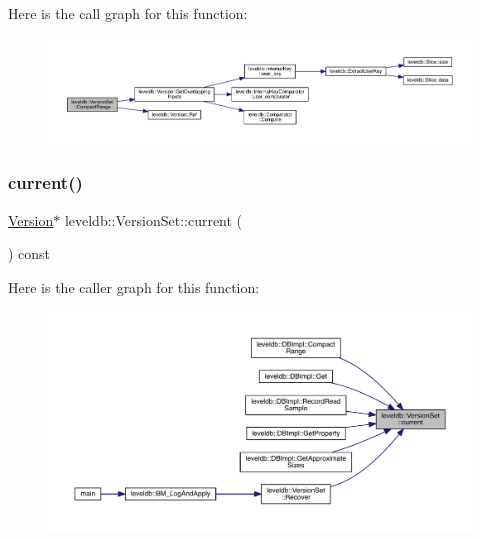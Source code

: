 Here is the call graph for this function\+:
\nopagebreak
\begin{figure}[H]
\begin{center}
\leavevmode
\includegraphics[width=350pt]{classleveldb_1_1_version_set_a3a03f9a6c86e861be314cf8e01f33142_cgraph}
\end{center}
\end{figure}
\mbox{\label{classleveldb_1_1_version_set_a4e8359d3967464ca94ac007e9346f10d}} 
\subsubsection{\texorpdfstring{current()}{current()}}
{\footnotesize\ttfamily \mbox{\hyperlink{classleveldb_1_1_version}{Version}}$\ast$ leveldb\+::\+Version\+Set\+::current (\begin{DoxyParamCaption}{ }\end{DoxyParamCaption}) const\hspace{0.3cm}{\ttfamily [inline]}}

Here is the caller graph for this function\+:
\nopagebreak
\begin{figure}[H]
\begin{center}
\leavevmode
\includegraphics[width=350pt]{classleveldb_1_1_version_set_a4e8359d3967464ca94ac007e9346f10d_icgraph}
\end{center}
\end{figure}
\mbox{\label{classleveldb_1_1_version_set_a265fa1089536e2b66cc3cc52a2a5bc1e}} 
